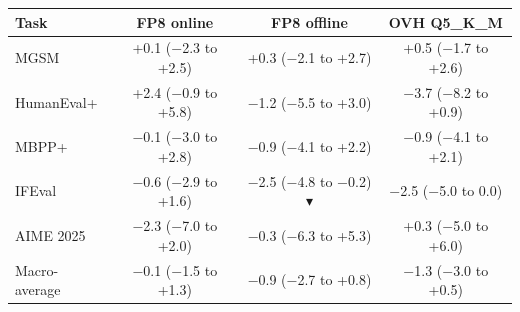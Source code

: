 \begin{tabular}{@{}lccc@{}}
\toprule
Task & FP8 online & FP8 offline & OVH Q5\_K\_M \\
\midrule
MGSM & +0.1 ($-$2.3 to +2.5) & +0.3 ($-$2.1 to +2.7) & +0.5 ($-$1.7 to +2.6) \\
HumanEval+ & +2.4 ($-$0.9 to +5.8) & $-$1.2 ($-$5.5 to +3.0) & $-$3.7 ($-$8.2 to +0.9) \\
MBPP+ & $-$0.1 ($-$3.0 to +2.8) & $-$0.9 ($-$4.1 to +2.2) & $-$0.9 ($-$4.1 to +2.1) \\
IFEval & $-$0.6 ($-$2.9 to +1.6) & \cellcolor[HTML]{F6D3C9}$-$2.5 ($-$4.8 to $-$0.2) \textcolor[HTML]{B4452A}{$\blacktriangledown$} & $-$2.5 ($-$5.0 to 0.0) \\
AIME 2025 & $-$2.3 ($-$7.0 to +2.0) & $-$0.3 ($-$6.3 to +5.3) & +0.3 ($-$5.0 to +6.0) \\
\midrule
Macro-average & $-$0.1 ($-$1.5 to +1.3) & $-$0.9 ($-$2.7 to +0.8) & $-$1.3 ($-$3.0 to +0.5) \\
\bottomrule
\end{tabular}
